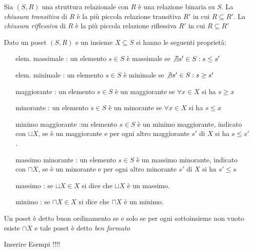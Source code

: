 Sia $(S,R)$ una struttura relazionale con $R$ è una relazione binaria su $S$.\newline
La \emph{chiusura transitiva} di $R$ è la più piccola relazione transitiva $R'$ in cui $R \subseteq R'$.
La \emph{chiusura riflessiva} di $R$ è la più piccola relazione riflessiva $R'$ in cui $R \subseteq R'$

\begin{prop}
Dato un poset $(S,R)$ e un insieme $X \subseteq S$ si hanno le seguenti proprietà:
\end{prop}
\begin{enumerate}
    \item[elem. massimale]: un elemento $s \in S$ è massimale se $\not \exists s' \in S : s \leq s'$
    \item[elem. minimale]: un elemento $s \in S$ è minimale se $\not \exists s' \in S : s \geq s'$
    \item[maggiorante]: un elemento $s \in S$ è un maggiorante se $\forall x \in X$ si ha $s \geq x$
    \item[minorante]: un elemento $s \in S$ è un minorante se $\forall x \in X$ si ha $s \leq x$
    \item[minimo maggiorante]:un elemento $s \in S$ è un minimo maggiorante, indicato con $\sqcup X$,
          se è un maggiorante e per ogni altro maggiorante $s'$ di $X$ si ha $s \leq s'$.
    \item[massimo minorante]: un elemento $s \in S$ è un massimo minorante, indicato con $\sqcap X$,
          se è un minorante e per ogni altro minorante $s'$ di $X$ si ha $s' \leq s$
    \item[massimo]: se $\sqcup X \in X$ si dice che $\sqcup X$ è un massimo.
    \item[minimo]: se $\sqcap X \in X$ si dice che $\sqcap X$ è un minimo.
\end{enumerate}

\begin{defi}
    Un poset è detto buon ordinamento se e solo se per ogni sottoinsieme non vuoto esiste
    $\cap X$ e tale poset è detto \emph{ben formato}
\end{defi}

Inserire Esempi !!!!
